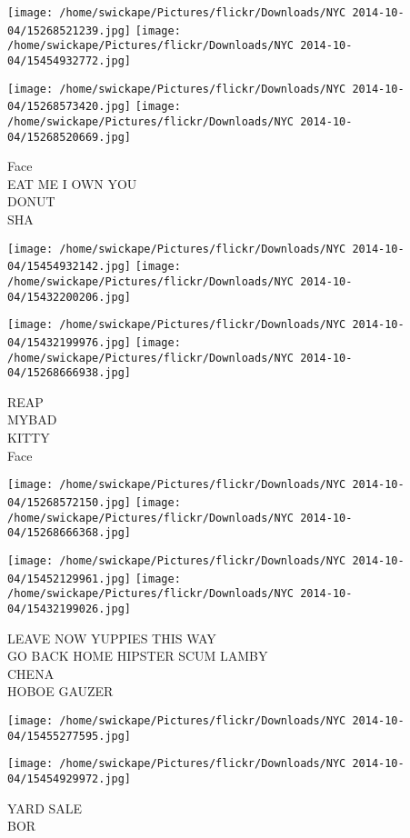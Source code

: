 \documentclass[10pt,letterpaper]{article}
\begin{document}
\texttt{[image: /home/swickape/Pictures/flickr/Downloads/NYC 2014-10-04/15268521239.jpg]}
\texttt{[image: /home/swickape/Pictures/flickr/Downloads/NYC 2014-10-04/15454932772.jpg]}

\texttt{[image: /home/swickape/Pictures/flickr/Downloads/NYC 2014-10-04/15268573420.jpg]}
\texttt{[image: /home/swickape/Pictures/flickr/Downloads/NYC 2014-10-04/15268520669.jpg]}

Face\\
EAT ME I OWN YOU\\
DONUT\\
SHA
\pagebreak

\texttt{[image: /home/swickape/Pictures/flickr/Downloads/NYC 2014-10-04/15454932142.jpg]}
\texttt{[image: /home/swickape/Pictures/flickr/Downloads/NYC 2014-10-04/15432200206.jpg]}

\texttt{[image: /home/swickape/Pictures/flickr/Downloads/NYC 2014-10-04/15432199976.jpg]}
\texttt{[image: /home/swickape/Pictures/flickr/Downloads/NYC 2014-10-04/15268666938.jpg]}

REAP\\
MYBAD\\
KITTY\\
Face
\pagebreak

\texttt{[image: /home/swickape/Pictures/flickr/Downloads/NYC 2014-10-04/15268572150.jpg]}
\texttt{[image: /home/swickape/Pictures/flickr/Downloads/NYC 2014-10-04/15268666368.jpg]}

\texttt{[image: /home/swickape/Pictures/flickr/Downloads/NYC 2014-10-04/15452129961.jpg]}
\texttt{[image: /home/swickape/Pictures/flickr/Downloads/NYC 2014-10-04/15432199026.jpg]}

LEAVE NOW YUPPIES THIS WAY\\
GO BACK HOME HIPSTER SCUM LAMBY\\
CHENA\\
HOBOE GAUZER
\pagebreak

\texttt{[image: /home/swickape/Pictures/flickr/Downloads/NYC 2014-10-04/15455277595.jpg]}

\vspace{0.25in}
\texttt{[image: /home/swickape/Pictures/flickr/Downloads/NYC 2014-10-04/15454929972.jpg]}

YARD SALE\\
BOR
\pagebreak
\end{document}
